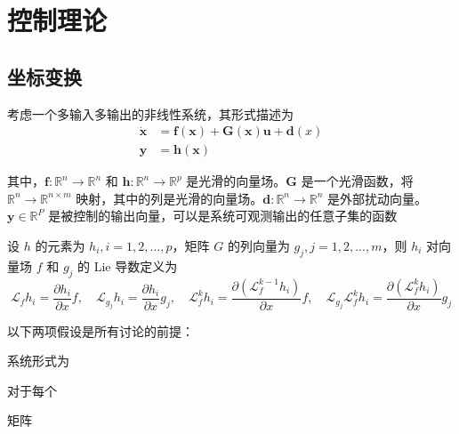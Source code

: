 \section{控制理论}

\subsection{坐标变换}
考虑一个多输入多输出的非线性系统，其形式描述为
\begin{equation}
  \begin{aligned}
    \dot{\boldsymbol{x}}&=\boldsymbol{f}(\boldsymbol{x})+\boldsymbol{G}(\boldsymbol{x})\boldsymbol{u} + \boldsymbol{d}(x)\\
    \boldsymbol{y}&=\boldsymbol{h}(\boldsymbol{x})
  \end{aligned}
  \label{system}
\end{equation}

其中，$\boldsymbol{f}: \mathbb{R}^{n}\to\mathbb{R}^{n}$ 和 $\boldsymbol{h}: \mathbb{R}^{n}\to\mathbb{R}^{p}$ 是光滑的向量场。$\boldsymbol{G}$ 是一个光滑函数，将 $\mathbb{R}^{n}\to\mathbb{R}^{n\times m}$ 映射，其中的列是光滑的向量场。$\boldsymbol{d}: \mathbb{R}^{n}\to\mathbb{R}^{n}$ 是外部扰动向量。$\boldsymbol{y}\in\mathbb{R}^{P}$ 是被控制的输出向量，可以是系统可观测输出的任意子集的函数

设 $h$ 的元素为 $h_i, i = 1, 2, ..., p$，矩阵 $G$ 的列向量为 $g_j, j = 1, 2, ..., m$，则 $h_i$ 对向量场 $f$ 和 $g_j$ 的 Lie 导数定义为
\begin{equation}
  \mathcal{L}_{f}h_{i}=\frac{\partial h_{i}}{\partial x}f,\quad\mathcal{L}_{g_{j}}h_{i}=\frac{\partial h_{i}}{\partial x}g_{j},\quad\mathcal{L}_{f}^{k}h_{i}=\frac{\partial(\mathcal{L}_{f}^{k-1}h_{i})}{\partial x}f,\quad\mathcal{L}_{g_{j}}\mathcal{L}_{f}^{k}h_{i}=\frac{\partial(\mathcal{L}_{f}^{k}h_{i})}{\partial x}g_{j}
\end{equation}

以下两项假设是所有讨论的前提：

\begin{assumption}\label{assumption1}
  系统形式为

\end{assumption}
 
\begin{assumption}\label{assumption2}
  对于每个 
\end{assumption}

\begin{remark}
  矩阵
\end{remark}

